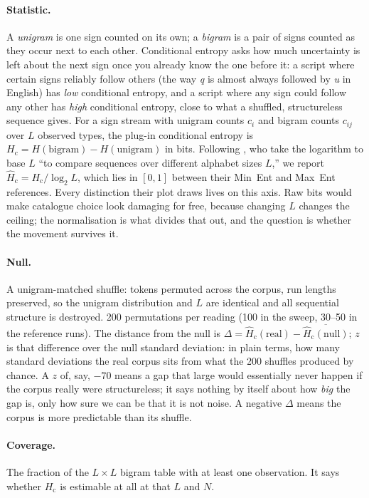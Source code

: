 \documentclass[11pt,a4paper]{article}
\newcommand{\Hc}{H_{\mathrm{c}}}
\newcommand{\Hcn}{\hat H_{\mathrm{c}}}
\begin{document}
\paragraph{Statistic.} A \emph{unigram} is one sign counted on its own; a \emph{bigram} is a pair of signs counted as they occur next to each other. Conditional entropy asks how much uncertainty is left about the next sign once you already know the one before it: a script where certain signs reliably follow others (the way \emph{q} is almost always followed by \emph{u} in English) has \emph{low} conditional entropy, and a script where any sign could follow any other has \emph{high} conditional entropy, close to what a shuffled, structureless sequence gives. For a sign stream with unigram counts $c_i$ and bigram counts $c_{ij}$ over $L$ observed types, the plug-in conditional entropy is $\Hc = H(\text{bigram}) - H(\text{unigram})$ in bits. Following \citet{rao2010reply}, who take the logarithm to base $L$ ``to compare sequences over different alphabet sizes $L$,'' we report $\Hcn = \Hc / \log_2 L$, which lies in $[0,1]$ between their Min~Ent and Max~Ent references. Every distinction their plot draws lives on this axis. Raw bits would make catalogue choice look damaging for free, because changing $L$ changes the ceiling; the normalisation is what divides that out, and the question is whether the movement survives it.

\paragraph{Null.} A unigram-matched shuffle: tokens permuted across the corpus, run lengths preserved, so the unigram distribution and $L$ are identical and all sequential structure is destroyed. 200 permutations per reading (100 in the sweep, 30--50 in the reference runs). The distance from the null is $\Delta = \Hcn(\text{real}) - \overline{\Hcn(\text{null})}$; $z$ is that difference over the null standard deviation: in plain terms, how many standard deviations the real corpus sits from what the 200 shuffles produced by chance. A $z$ of, say, $-70$ means a gap that large would essentially never happen if the corpus really were structureless; it says nothing by itself about how \emph{big} the gap is, only how sure we can be that it is not noise. A negative $\Delta$ means the corpus is more predictable than its shuffle.

\paragraph{Coverage.} The fraction of the $L \times L$ bigram table with at least one observation. It says whether $\Hc$ is estimable at all at that $L$ and $N$.
\end{document}
